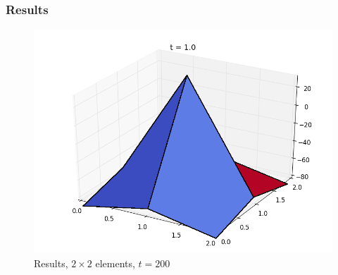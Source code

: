 \subsubsection{Results}
%
%
%


%
%  
%
%

\begin{figure}[ht]
  \centering 
  \includegraphics[width=0.9\columnwidth]{examples/example-0402/doc/figures/current_run_l1x1_n2x2_i1_s0_p1__t200.png} 
  \caption{Results, $2\times 2$ elements, $t=200$}
  \label{example-0402-current-run1-fig}
\end{figure}

